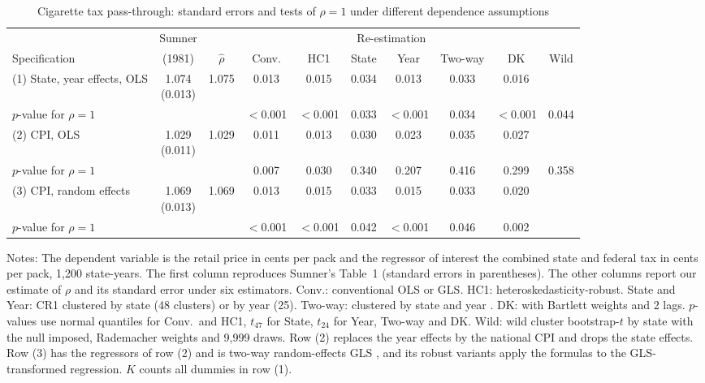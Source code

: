 \begin{table}[htbp]
\centering
\begin{threeparttable}
\caption{Cigarette tax pass-through: standard errors and tests of $\rho = 1$ under different dependence assumptions}
\label{tab:A-sumner}
\small
\setlength{\tabcolsep}{3.6pt}
\begin{tabular}{@{}lccccccccc@{}}
\toprule
& Sumner & \multicolumn{8}{c}{Re-estimation} \\
\cmidrule(lr){2-2}\cmidrule(l){3-10}
Specification & (1981) & $\hat\rho$ & Conv. & HC1 & State & Year & Two-way & DK & Wild \\
\midrule
(1) State, year effects, OLS & \makecell{1.074\\(0.013)} & 1.075 & 0.013 & 0.015 & 0.034 & 0.013 & 0.033 & 0.016 & \\
\quad $p$-value for $\rho = 1$ & & & $<$0.001 & $<$0.001 & 0.033 & $<$0.001 & 0.034 & $<$0.001 & 0.044 \\
\addlinespace
(2) CPI, OLS & \makecell{1.029\\(0.011)} & 1.029 & 0.011 & 0.013 & 0.030 & 0.023 & 0.035 & 0.027 & \\
\quad $p$-value for $\rho = 1$ & & & 0.007 & 0.030 & 0.340 & 0.207 & 0.416 & 0.299 & 0.358 \\
\addlinespace
(3) CPI, random effects & \makecell{1.069\\(0.013)} & 1.069 & 0.013 & 0.015 & 0.033 & 0.015 & 0.033 & 0.020 & \\
\quad $p$-value for $\rho = 1$ & & & $<$0.001 & $<$0.001 & 0.042 & $<$0.001 & 0.046 & 0.002 & \\
\bottomrule
\end{tabular}
\begin{tablenotes}\footnotesize
\item Notes: The dependent variable is the retail price in cents per pack and the regressor of interest the combined
state and federal tax in cents per pack, 1,200 state-years. The first column reproduces Sumner's Table~1 (standard
errors in parentheses). The other columns report our estimate of $\rho$ and its standard error under six
estimators. Conv.: conventional OLS or GLS. HC1: heteroskedasticity-robust. State and Year: CR1 clustered by state
(48 clusters) or by year (25). Two-way: clustered by state and year \citep{CameronGelbachMiller2011}. DK:
\citet{DriscollKraay1998} with Bartlett weights and 2 lags. $p$-values use normal quantiles for Conv.\ and HC1,
$t_{47}$ for State, $t_{24}$ for Year, Two-way and DK. Wild: wild cluster bootstrap-$t$ by state with the null
imposed, Rademacher weights and 9,999 draws. Row (2) replaces the year effects by the national CPI and drops the
state effects. Row (3) has the regressors of row (2) and is two-way random-effects GLS \citep{FullerBattese1974}, and
its robust variants apply the formulas to the GLS-transformed regression. $K$ counts all dummies in row (1).
\end{tablenotes}
\end{threeparttable}
\end{table}

